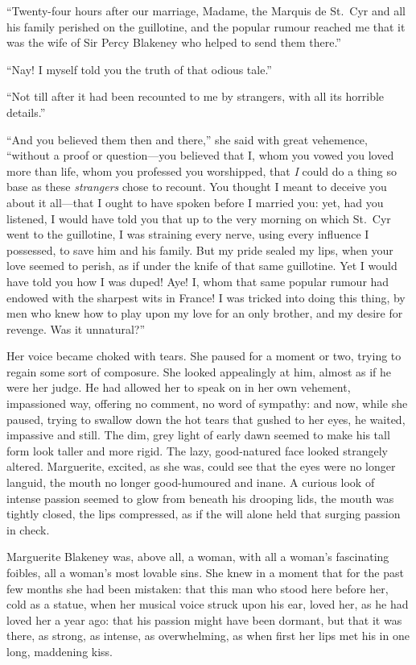 \documentclass[paper=a5,BCOR=7mm,twoside,DIV=calc,12pt,usegeometry,chapterprefix,endperiod,headings=big]{scrbook}
\begin{document}
\enquote{Twenty-four hours after our marriage, Madame, the Marquis de St.~Cyr and all his family perished on the guillotine, and the popular rumour reached me that it was the wife of Sir Percy Blakeney who helped to send them there.}

\enquote{Nay! I myself told you the truth of that odious tale.}

\enquote{Not till after it had been recounted to me by strangers, with all its horrible details.}

\enquote{And you believed them then and there,} she said with great vehemence, \enquote{without a proof or question---you believed that I, whom you vowed you loved more than life, whom you professed you worshipped, that \textit{I} could do a thing so base as these \textit{strangers} chose to recount. You thought I meant to deceive you about it all---that I ought to have spoken before I married you: yet, had you listened, I would have told you that up to the very morning on which St.~Cyr went to the guillotine, I was straining every nerve, using every influence I possessed, to save him and his family. But my pride sealed my lips, when your love seemed to perish, as if under the knife of that same guillotine. Yet I would have told you how I was duped! Aye! I, whom that same popular rumour had endowed with the sharpest wits in France! I was tricked into doing this thing, by men who knew how to play upon my love for an only brother, and my desire for revenge. Was it unnatural?}

Her voice became choked with tears. She paused for a moment or two, trying to regain some sort of composure. She looked appealingly at him, almost as if he were her judge. He had allowed her to speak on in her own vehement, impassioned way, offering no comment, no word of sympathy: and now, while she paused, trying to swallow down the hot tears that gushed to her eyes, he waited, impassive and still. The dim, grey light of early dawn seemed to make his tall form look taller and more rigid. The lazy, good-natured face looked strangely altered. Marguerite, excited, as she was, could see that the eyes were no longer languid, the mouth no longer good-humoured and inane. A curious look of intense passion seemed to glow from beneath his drooping lids, the mouth was tightly closed, the lips compressed, as if the will alone held that surging passion in check.

Marguerite Blakeney was, above all, a woman, with all a woman's fascinating foibles, all a woman's most lovable sins. She knew in a moment that for the past few months she had been mistaken: that this man who stood here before her, cold as a statue, when her musical voice struck upon his ear, loved her, as he had loved her a year ago: that his passion might have been dormant, but that it was there, as strong, as intense, as overwhelming, as when first her lips met his in one long, maddening kiss.
\end{document}
